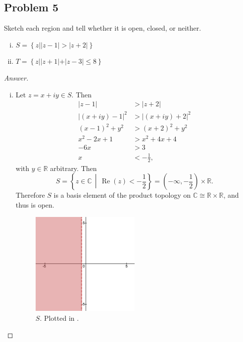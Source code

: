 \documentclass[12pt]{article}
\newcommand{\cx}{\mathbb{C}}
\newcommand{\real}{\mathbb{R}}
\newcommand\paren[1]{\left( #1 \right)}
\newcommand\setb[1]{\left \{ #1 \right \}}
\theoremstyle{definition}
\DeclareMathOperator\re{Re}
\begin{document}
\subsection{Problem 5 \texorpdfstring{\cite{Desmos,Elbow}}{}}
Sketch each region and tell whether it is open, closed, or neither.
\begin{multicols}{2}
    \begin{enumerate}[i)]
        \item $S = \setb{ z | |z-1| > |z+2| }$
        \item $T = \setb{ z | |z+1| + |z-3| \leq 8 }$
    \end{enumerate}
\end{multicols}
\begin{proof}[Answer]
    \noindent
    \begin{enumerate}[i)]
        \item Let $z = x + iy \in S$. Then 
        \begin{align*}
            |z - 1| & > |z + 2| \\
            |(x+iy) - 1|^2 & > |(x+iy) + 2|^2 \\
            (x-1)^2 + y^2 & > (x+2)^2 + y^2 \\
            x^2 - 2x + 1 & > x^2 + 4x + 4 \\
            -6x & > 3 \\
            x & < -\frac{1}{2},
        \end{align*}
        with $y \in \real$ arbitrary. Then 
        \[
            S = \setb{ z \in \cx \, \middle| \, \re(z) < -\frac{1}{2} } = \paren{ -\infty , -\frac{1}{2} } \times \real.
        \]
        Therefore $S$ is a basis element of the product topology on $\cx \cong \real \times \real$, and thus is open.
        \begin{figure}[H]
            \centering
            \includegraphics[width = 0.5\textwidth]{4.png}
            \caption{$S$. Plotted in \cite{Desmos}.}

\end{figure}
\end{enumerate}
\end{proof}
\end{document}
